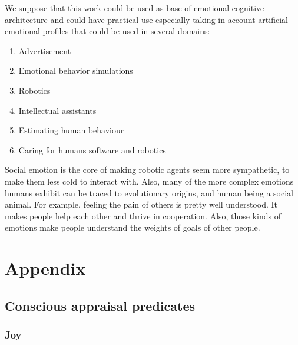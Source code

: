 We suppose that this work could be used as base of emotional cognitive architecture and could have practical use especially taking in account artificial emotional profiles that could be used in several domains:

\begin{enumerate}
 \item  Advertisement
 \item  Emotional behavior simulations
 \item  Robotics
 \item  Intellectual assistants
 \item  Estimating human behaviour
 \item  Caring for humans software and robotics
\end{enumerate}

Social emotion is the core of making robotic agents seem more sympathetic, to make them less cold to interact with.
Also, many of the more complex emotions humans exhibit can be traced to evolutionary origins, and human being a social animal.
For example, feeling the pain of others is pretty well understood. It makes people help each other and thrive in cooperation.
Also, those kinds of emotions make people understand the weights of goals of other people.

\section{Appendix}

\subsection{Conscious appraisal predicates}

\subsubsection{Joy}


